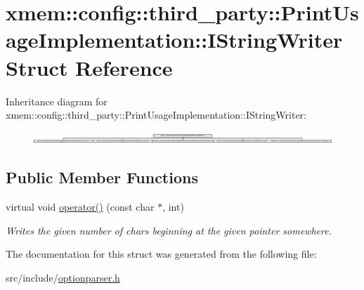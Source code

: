 \hypertarget{structxmem_1_1config_1_1third__party_1_1_print_usage_implementation_1_1_i_string_writer}{}\section{xmem\+:\+:config\+:\+:third\+\_\+party\+:\+:Print\+Usage\+Implementation\+:\+:I\+String\+Writer Struct Reference}
\label{structxmem_1_1config_1_1third__party_1_1_print_usage_implementation_1_1_i_string_writer}
Inheritance diagram for xmem\+:\+:config\+:\+:third\+\_\+party\+:\+:Print\+Usage\+Implementation\+:\+:I\+String\+Writer\+:\begin{figure}[H]
\begin{center}
\leavevmode
\includegraphics[height=0.440945cm]{structxmem_1_1config_1_1third__party_1_1_print_usage_implementation_1_1_i_string_writer}
\end{center}
\end{figure}
\subsection*{Public Member Functions}
\begin{DoxyCompactItemize}
\item 
\hypertarget{structxmem_1_1config_1_1third__party_1_1_print_usage_implementation_1_1_i_string_writer_aa391efef2dec3e18d614afb7e093a034}{}virtual void \hyperlink{structxmem_1_1config_1_1third__party_1_1_print_usage_implementation_1_1_i_string_writer_aa391efef2dec3e18d614afb7e093a034}{operator()} (const char $\ast$, int)\label{structxmem_1_1config_1_1third__party_1_1_print_usage_implementation_1_1_i_string_writer_aa391efef2dec3e18d614afb7e093a034}

\begin{DoxyCompactList}\small\item\em Writes the given number of chars beginning at the given pointer somewhere. \end{DoxyCompactList}\end{DoxyCompactItemize}


The documentation for this struct was generated from the following file\+:\begin{DoxyCompactItemize}
\item 
src/include/\hyperlink{optionparser_8h}{optionparser.\+h}\end{DoxyCompactItemize}
